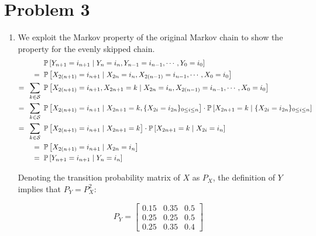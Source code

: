 \documentclass[12pt]{article}%
\begin{document}
\section{Problem 3}%
\label{sec:problem-3}

\begin{enumerate}
  \item We exploit the Markov property of the original Markov chain to show the property for the evenly skipped chain.
      \begin{align*}
        & \mathbb{P}\left[Y_{n+1} = i_{n+1} \mid Y_{n} = i_n, Y_{n-1} = i_{n-1}, \cdots, Y_0 = i_{0}\right] \\
      = \phantom{,} & \mathbb{P}\left[X_{2(n+1)} = i_{n+1} \mid X_{2n} = i_n, X_{2(n-1)} = i_{n-1}, \cdots, X_0 = i_{0}\right] \\
        = \phantom{,}  \sum_{k \in \mathcal{S}} \phantom{,} & \mathbb{P}\left[X_{2(n+1)} = i_{n+1}, X_{2n+1} = k \mid X_{2n} = i_n, X_{2(n-1)} = i_{n-1}, \cdots, X_0 = i_{0}\right] \\
        = \phantom{,}  \sum_{k \in \mathcal{S}} \phantom{,} & \mathbb{P}\left[X_{{2(n+1)}} = i_{n+1} \mid X_{2n + 1} = k, \{X_{2i} = i_{2n}\}_{0 \leq i \leq n}\right] \cdot \mathbb{P}\left[X_{2n + 1} = k \mid  \{X_{2i} = i_{2n}\}_{0 \leq i \leq n}\right] \\
        = \phantom{,}  \sum_{k \in \mathcal{S}} \phantom{,} & \mathbb{P}\left[X_{{2(n+1)}} = i_{n+1} \mid X_{2n + 1} = k\right] \cdot \mathbb{P}\left[X_{2n + 1} = k \mid X_{2i} = i_n\right] \\
        = \phantom{,} & \mathbb{P}\left[X_{{2(n+1)}} = i_{n+1} \mid X_{2n} = i_{n}\right] \\
        = \phantom{,} & \mathbb{P}\left[Y_{n+1} = i_{n+1} \mid Y_{n} = i_{n}\right]
      \end{align*}

        Denoting the transition probability matrix of $X$ as $P_{X}$, the definition of $Y$ implies that $P_{Y} = P_{X}^{2}$:

        \[P_{Y} = \begin{bmatrix}
                    0.15 & 0.35 & 0.5 \\
                    0.25 & 0.25 & 0.5 \\
                    0.25 & 0.35 & 0.4
                  \end{bmatrix}\]


\end{enumerate}
\end{document}
